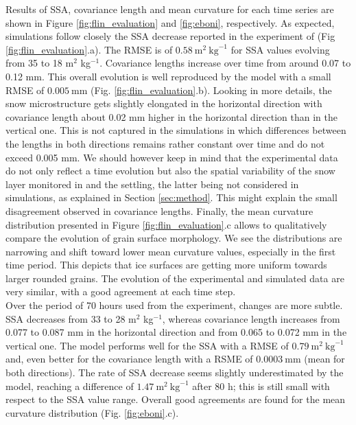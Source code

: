 \documentclass[draft,ms]{agujournal2019}
\begin{document}
Results of SSA, covariance length and mean curvature for each time series are shown in Figure \ref{fig:flin_evaluation} and \ref{fig:eboni}, respectively. As expected, simulations follow closely the SSA decrease reported in the experiment of  (Fig \ref{fig:flin_evaluation}.a).
The RMSE is of $0.58\ \mathrm{m}^2\ \mathrm{kg}^{-1}$ for SSA values evolving from 35 to 18 m$^2$ kg$^{-1}$.
Covariance lengths increase over time from around 0.07 to 0.12 mm. This overall evolution is well reproduced by the model with a small RMSE of $0.005\ \mathrm{mm}$ (Fig. \ref{fig:flin_evaluation}.b). Looking in more details, the snow microstructure gets slightly elongated in the horizontal direction with covariance length about 0.02 mm higher in the horizontal direction than in the vertical one. This is not captured in the simulations in which differences between the lengths in both directions remains rather constant over time and do not exceed 0.005 mm. We should however keep in mind that the experimental data do not only reflect a time evolution but also the spatial variability of the snow layer monitored in  and the settling, the latter being not considered in simulations, as explained in Section \ref{sec:method}. This might explain the small disagreement observed in covariance lengths.
Finally, the mean curvature distribution presented in Figure \ref{fig:flin_evaluation}.c allows to qualitatively compare the evolution of grain surface morphology. We see the distributions are narrowing and shift toward lower mean curvature values, especially in the first time period. This depicts that ice surfaces are getting more uniform towards larger rounded grains. The evolution of the experimental and simulated data are very similar, with a good agreement at each time step.\\

 Over the  period of 70 hours used from the  experiment, changes are more subtle. SSA decreases from 33 to 28 m$^2$ kg$^{-1}$, whereas covariance length increases from 0.077 to 0.087 mm in the horizontal direction and from 0.065 to 0.072 mm in the vertical one. The model performs well for the SSA with a RMSE of $0.79\ \mathrm{m}^2\ \mathrm{kg}^{-1}$ and, even better for the covariance length with a RSME of $0.0003\ \mathrm{mm}$ (mean for both directions).
The rate of SSA decrease seems slightly underestimated by the model, reaching a difference of $1.47\ \mathrm{m}^2\ \mathrm{kg}^{-1}$ after 80 h; this is still small with respect to the SSA value range. Overall good agreements are found for the mean curvature distribution (Fig. \ref{fig:eboni}.c). \\
\end{document}
